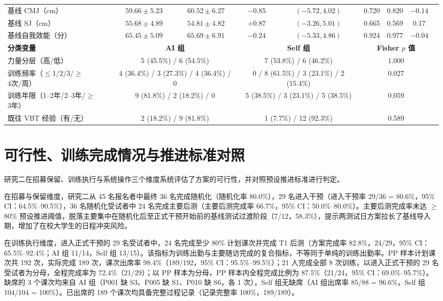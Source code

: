 \documentclass[UTF8,zihao=-4,twoside,openany]{ctexbook}
\begin{document}
\begin{table}[htbp]
\begin{tabularx}{\textwidth}{lcccccccc}
    基线 CMJ（cm） & $59.66 \pm 5.23$ & $60.52 \pm 6.27$ & $-0.85$ & $(-5.72, 4.02)$ & 0.720 & 0.820 & $-0.14$ \\
    基线 SJ（cm） & $55.68 \pm 4.89$ & $54.81 \pm 4.82$ & $+0.87$ & $(-3.26, 5.01)$ & 0.665 & 0.569 & 0.17 \\
    基线自我效能（分） & $65.45 \pm 5.09$ & $65.69 \pm 6.91$ & $-0.24$ & $(-5.33, 4.86)$ & 0.924 & 0.977 & $-0.04$ \\
    \midrule
    \textbf{分类变量} & \multicolumn{2}{c}{\textbf{AI 组}} & \multicolumn{2}{c}{\textbf{Self 组}} & \multicolumn{3}{c}{\textbf{Fisher $p$ 值}} \\
    \midrule
    力量分层（高/低） & \multicolumn{2}{c}{5 (45.5\%) / 6 (54.5\%)} & \multicolumn{2}{c}{7 (53.8\%) / 6 (46.2\%)} & \multicolumn{3}{c}{1.000} \\
    训练频率（$\le$1/2/3/$\ge$4次/周） & \multicolumn{2}{c}{4 (36.4\%) / 3 (27.3\%) / 4 (36.4\%) / 0} & \multicolumn{2}{c}{0 / 8 (61.5\%) / 3 (23.1\%) / 2 (15.4\%)} & \multicolumn{3}{c}{0.027} \\
    训练年限（1--2年/2--3年/$\ge$3年） & \multicolumn{2}{c}{9 (81.8\%) / 2 (18.2\%) / 0} & \multicolumn{2}{c}{5 (38.5\%) / 3 (23.1\%) / 5 (38.5\%)} & \multicolumn{3}{c}{0.059} \\
    既往 VBT 经验（有/无） & \multicolumn{2}{c}{2 (18.2\%) / 9 (81.8\%)} & \multicolumn{2}{c}{1 (7.7\%) / 12 (92.3\%)} & \multicolumn{3}{c}{0.589} \\
    \bottomrule
  \end{tabularx}
\end{table}

\section{可行性、训练完成情况与推进标准对照}
研究二在招募保留、训练执行与系统操作三个维度系统评估了方案的可行性，并对照预设推进标准进行判定。

在招募与保留维度，研究二从 45 名报名者中最终 36 名完成随机化（随机化率 80.0\%），29 名进入干预（进入干预率 29/36 = 80.6\%，95\% CI：64.5\%--90.5\%），36 名随机化受试者中 24 名完成主要后测（主要后测完成率 66.7\%，95\% CI：50.0\%--80.0\%）。主要后测完成率未达 $\ge$80\% 预设推进阈值，脱落主要集中在随机化后至正式干预开始前的基线测试过渡阶段（7/12，58.3\%），提示两测试日方案拉长了基线导入期，增加了在校大学生的日程冲突风险。

在训练执行维度，进入正式干预的 29 名受试者中，24 名完成至少 80\% 计划课次并完成 T1 后测（方案完成率 82.8\%，24/29，95\% CI：65.5\%--92.4\%；AI 组 11/14，Self 组 13/15）。该指标为训练出勤与主要随访完成的复合指标，不等同于单纯的训练出勤率。PP 样本计划课次共 192 次，实际完成 189 次，课次出席率 98.4\%（189/192，95\% CI：95.5\%--99.5\%）；21 人完成全部 8 次训练，以进入正式干预的 29 名受试者为分母，全程完成率为 72.4\%（21/29）；以 PP 样本为分母，PP 样本内全程完成比例为 87.5\%（21/24，95\% CI：69.0\%--95.7\%）。缺席的 3 个课次均来自 AI 组（P001 缺 S3、P005 缺 S1、P010 缺 S6，各 1 次），Self 组无缺席（AI 组出席率 85/88 = 96.6\%，Self 组 104/104 = 100\%）。已出席的 189 个课次均具备完整过程记录（记录完整率 100\%，189/189）。
\end{document}
